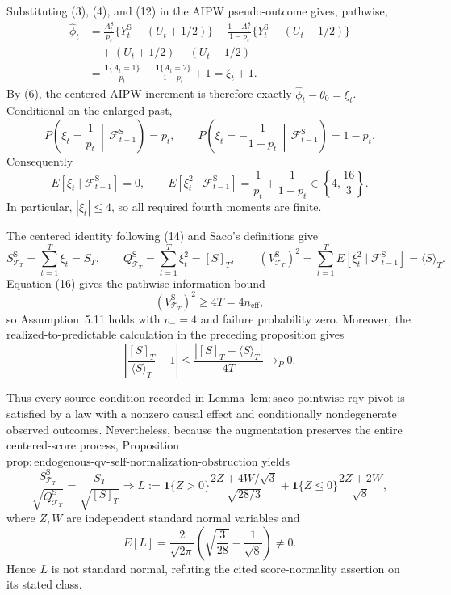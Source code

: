 Substituting (3), (4), and (12) in the AIPW pseudo-outcome gives, pathwise,
\[
\begin{aligned}
\widehat\phi_t
&=\frac{A_t^{\mathrm S}}{p_t}\{Y_t^{\mathrm S}-(U_t+1/2)\}
-\frac{1-A_t^{\mathrm S}}{1-p_t}\{Y_t^{\mathrm S}-(U_t-1/2)\}\\
&\quad +(U_t+1/2)-(U_t-1/2)\\
&=\frac{\mathbf1\{A_t=1\}}{p_t}
-\frac{\mathbf1\{A_t=2\}}{1-p_t}+1
=\xi_t+1.
\end{aligned}
\tag{14}
\]
By (6), the centered AIPW increment is therefore exactly \(\widehat\phi_t-\theta_0=\xi_t\).  Conditional on the enlarged past,
\[
P\!\left(\xi_t=\frac1{p_t}\,\middle|\,\mathcal F_{t-1}^{\mathrm S}\right)=p_t,
\qquad
P\!\left(\xi_t=-\frac1{1-p_t}\,\middle|\,\mathcal F_{t-1}^{\mathrm S}\right)=1-p_t.
\tag{15}
\]
Consequently
\[
E[\xi_t\mid\mathcal F_{t-1}^{\mathrm S}]=0,
\qquad
E[\xi_t^2\mid\mathcal F_{t-1}^{\mathrm S}]
=\frac1{p_t}+\frac1{1-p_t}\in\left\{4,\frac{16}{3}\right\}.
\tag{16}
\]
In particular, \(|\xi_t|\le4\), so all required fourth moments are finite.

The centered identity following (14) and Saco's definitions give
\[
S_{\mathcal T_T}^{\mathrm S}=\sum_{t=1}^T\xi_t=S_T,
\qquad
Q_{\mathcal T_T}^{\mathrm S}=\sum_{t=1}^T\xi_t^2=[S]_T,
\qquad
(V_{\mathcal T_T}^{\mathrm S})^2
=\sum_{t=1}^TE[\xi_t^2\mid\mathcal F_{t-1}^{\mathrm S}]
=\langle S\rangle_T.
\tag{17}
\]
Equation (16) gives the pathwise information bound
\[
(V_{\mathcal T_T}^{\mathrm S})^2\ge4T=4n_{\mathrm{eff}},
\tag{18}
\]
so Assumption~5.11 holds with \(v_-=4\) and failure probability zero.  Moreover, the realized-to-predictable calculation in the preceding proposition gives
\[
\left|\frac{[S]_T}{\langle S\rangle_T}-1\right|
\le\frac{|[S]_T-\langle S\rangle_T|}{4T}\to_P0.
\tag{19}
\]

Thus every source condition recorded in Lemma~\(\mathrm{lem:saco\text{-}pointwise\text{-}rqv\text{-}pivot}\) is satisfied by a law with a nonzero causal effect and conditionally nondegenerate observed outcomes.  Nevertheless, because the augmentation preserves the entire centered-score process, Proposition~\(\mathrm{prop:endogenous\text{-}qv\text{-}self\text{-}normalization\text{-}obstruction}\) yields
\[
\frac{S_{\mathcal T_T}^{\mathrm S}}{\sqrt{Q_{\mathcal T_T}^{\mathrm S}}}
=\frac{S_T}{\sqrt{[S]_T}
}\Longrightarrow
L:=\mathbf1\{Z>0\}\frac{2Z+4W/\sqrt3}{\sqrt{28/3}}
+\mathbf1\{Z\le0\}\frac{2Z+2W}{\sqrt8},
\tag{20}
\]
where \(Z,W\) are independent standard normal variables and
\[
E[L]=\frac2{\sqrt{2\pi}}
\left(\sqrt{\frac3{28}}-\frac1{\sqrt8}\right)\ne0.
\tag{21}
\]
Hence \(L\) is not standard normal, refuting the cited score-normality assertion on its stated class.

